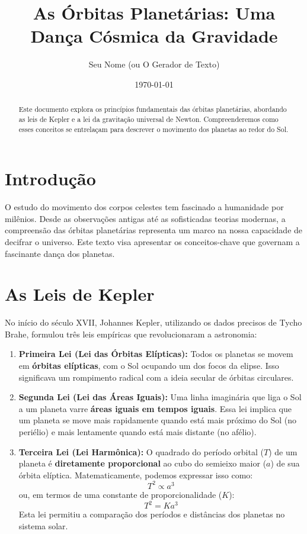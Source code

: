 \documentclass{article}
\title{As Órbitas Planetárias: Uma Dança Cósmica da Gravidade}
\author{Seu Nome (ou O Gerador de Texto)}
\date{\today}
\begin{document}
\maketitle

\begin{abstract}
Este documento explora os princípios fundamentais das órbitas planetárias, abordando as leis de Kepler e a lei da gravitação universal de Newton. Compreenderemos como esses conceitos se entrelaçam para descrever o movimento dos planetas ao redor do Sol.
\end{abstract}

\section{Introdução}
O estudo do movimento dos corpos celestes tem fascinado a humanidade por milênios. Desde as observações antigas até as sofisticadas teorias modernas, a compreensão das órbitas planetárias representa um marco na nossa capacidade de decifrar o universo. Este texto visa apresentar os conceitos-chave que governam a fascinante dança dos planetas.

\section{As Leis de Kepler}
No início do século XVII, Johannes Kepler, utilizando os dados precisos de Tycho Brahe, formulou três leis empíricas que revolucionaram a astronomia:

\begin{enumerate}
    \item \textbf{Primeira Lei (Lei das Órbitas Elípticas):} Todos os planetas se movem em \textbf{órbitas elípticas}, com o Sol ocupando um dos focos da elipse. Isso significava um rompimento radical com a ideia secular de órbitas circulares.
    \item \textbf{Segunda Lei (Lei das Áreas Iguais):} Uma linha imaginária que liga o Sol a um planeta varre \textbf{áreas iguais em tempos iguais}. Essa lei implica que um planeta se move mais rapidamente quando está mais próximo do Sol (no periélio) e mais lentamente quando está mais distante (no afélio).
    \item \textbf{Terceira Lei (Lei Harmônica):} O quadrado do período orbital ($T$) de um planeta é \textbf{diretamente proporcional} ao cubo do semieixo maior ($a$) de sua órbita elíptica. Matematicamente, podemos expressar isso como:
    $$ T^2 \propto a^3 $$
    ou, em termos de uma constante de proporcionalidade ($K$):
    $$ T^2 = K a^3 $$
    Esta lei permitiu a comparação dos períodos e distâncias dos planetas no sistema solar.
\end{enumerate}
\end{document}
